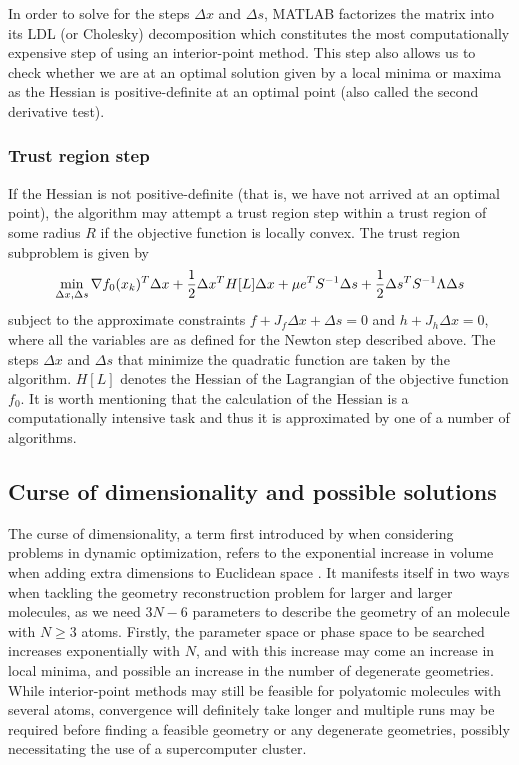 In order to solve for the steps $\Delta x$ and $\Delta s$, MATLAB factorizes the matrix into its LDL (or Cholesky) decomposition which constitutes the most computationally expensive step of using an interior-point method. This step also allows us to check whether we are at an optimal solution given by a local minima or maxima as the Hessian is positive-definite at an optimal point (also called the second derivative test).

\subsubsection*{Trust region step}
If the Hessian is not positive-definite (that is, we have not arrived at an optimal point), the algorithm may attempt a trust region step within a trust region of some radius $R$ if the objective function is locally convex. The trust region subproblem is given by
\begin{equation}
\operatornamewithlimits{min}_{\Delta x, \Delta s} \nabla f_0(x_k)^T \Delta x + \frac{1}{2} \Delta x^T H[L]\Delta x + \mu e^T S^{-1} \Delta s + \frac{1}{2}\Delta s^T S^{-1} \Lambda \Delta s
\end{equation}
subject to the approximate constraints $f + J_f \Delta x + \Delta s = 0$ and   $h + J_h \Delta x = 0$, where all the variables are as defined for the Newton step described above. The steps $\Delta x$ and $\Delta s$ that minimize the quadratic function are taken by the algorithm. $H[L]$ denotes the Hessian of the Lagrangian of the objective function $f_0$. It is worth mentioning that the calculation of the Hessian is a computationally intensive task and thus it is approximated by one of a number of algorithms.

\subsection{Curse of dimensionality and possible solutions} \label{ssec:curse}
The curse of dimensionality, a term first introduced by \citet{Bellman57} when considering problems in dynamic optimization, refers to the exponential increase in volume when adding extra dimensions to Euclidean space \citep{Keogh10}. It manifests itself in two ways when tackling the geometry reconstruction problem for larger and larger molecules, as we need $3N-6$ parameters to describe the geometry of an molecule with $N \ge 3$ atoms. Firstly, the parameter space or phase space to be searched increases exponentially with $N$, and with this increase may come an increase in local minima, and possible an increase in the number of degenerate geometries. While interior-point methods may still be feasible for polyatomic molecules with several atoms, convergence will definitely take longer and multiple runs may be required before finding a feasible geometry or any degenerate geometries, possibly necessitating the use of a supercomputer cluster.


